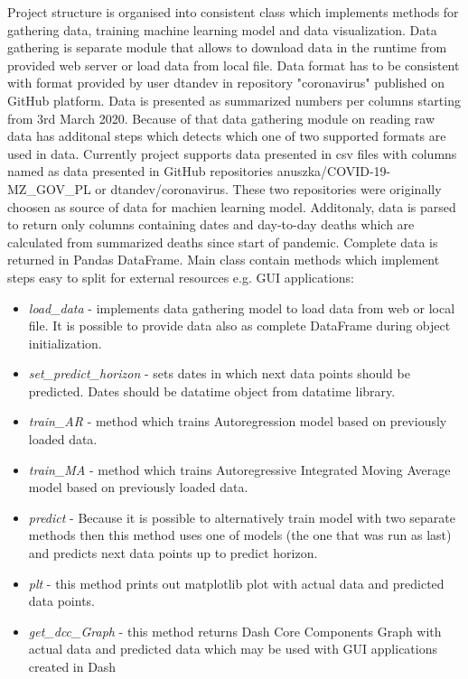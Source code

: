 \documentclass[conference]{IEEEtran}
\begin{document}
Project structure is organised into consistent class which implements methods for gathering data, training machine learning model and data visualization.
\newline
\newline
Data gathering is separate module that allows to download data in the runtime from provided web server or load data from local file.
Data format has to be consistent with format provided by user dtandev in repository "coronavirus" published on GitHub platform.
Data is presented as summarized numbers per columns starting from 3rd March 2020.
Because of that data gathering module on reading raw data has additonal steps which
detects which one of two supported formats are used in data.
Currently project supports data presented in csv files with columns named as data presented in GitHub repositories anuszka/COVID-19-MZ\_GOV\_PL or dtandev/coronavirus.
These two repositories were originally choosen as source of data for machien learning model.
Additonaly, data is parsed to return only columns containing dates and day-to-day deaths which are calculated from summarized deaths since start of pandemic.
Complete data is returned in Pandas DataFrame.
\newline
\newline
Main class contain methods which implement steps easy to split for external resources e.g. GUI applications:
\begin{itemize}
\item \textit{load\_data} - implements data gathering model to load data from web or local file. It is possible to provide data also as complete DataFrame during object initialization.
\item \textit{set\_predict\_horizon} - sets dates in which next data points should be predicted. Dates should be datatime object from datatime library.
\item \textit{train\_AR} - method which trains Autoregression model based on previously loaded data.
\item \textit{train\_MA} - method which trains Autoregressive Integrated Moving Average model based on previously loaded data.
\item \textit{predict} - Because it is possible to alternatively train model with two separate methods then this method uses one of models (the one that was run as last) and predicts next data points up to predict horizon.
\item \textit{plt} - this method prints out matplotlib plot with actual data and predicted data points.
\item \textit{get\_dcc\_Graph} - this method returns Dash Core Components Graph with actual data and predicted data which may be used with GUI applications created in Dash
\end{itemize}
\end{document}

